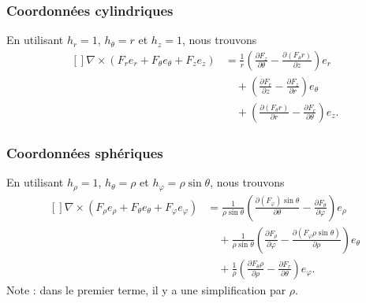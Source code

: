 \subsubsection{Coordonnées cylindriques}

En utilisant $h_r=1$, $h_{\theta}=r$ et $h_z=1$, nous trouvons
\begin{equation}        \label{EqRotationnelCylin}
	\begin{aligned}[]
		\nabla\times(F_re_r+F_{\theta}e_{\theta}+F_ze_z) & =\frac{1}{ r }\left( \frac{ \partial F_z }{ \partial \theta }-\frac{ \partial (F_{\theta}r) }{ \partial z } \right)e_r \\
		                                                 & \quad+\left( \frac{ \partial F_r }{ \partial z }-\frac{ \partial F_z }{ \partial r } \right)e_{\theta}                 \\
		                                                 & \quad+\left( \frac{ \partial (F_{\theta} r) }{ \partial r }-\frac{ \partial F_r }{ \partial \theta } \right)e_z.
	\end{aligned}
\end{equation}

\subsubsection{Coordonnées sphériques}

En utilisant $h_{\rho}=1$, $h_{\theta}=\rho$ et $h_{\varphi}=\rho\sin\theta$, nous trouvons
\begin{equation}
	\begin{aligned}[]
		\nabla\times(F_{\rho}e_{\rho}+F_{\theta}e_{\theta}+F_{\varphi}e_{\varphi}) & =\frac{1}{ \rho\sin\theta }\left( \frac{ \partial (F_{\varphi})\sin\theta }{ \partial \theta }-\frac{ \partial F_{\theta} }{ \partial \varphi } \right)e_{\rho}        \\
		                                                                           & \quad+\frac{1}{ \rho\sin\theta }\left( \frac{ \partial F_{\rho} }{ \partial \varphi }-\frac{ \partial (F_{\varphi}\rho\sin\theta) }{ \partial \rho } \right)e_{\theta} \\
		                                                                           & \quad+\frac{1}{ \rho }\left( \frac{ \partial F_{\theta}\rho }{ \partial \rho }-\frac{ \partial F_r }{ \partial \theta } \right)e_{\varphi}.
	\end{aligned}
\end{equation}
Note : dans le premier terme, il y a une simplification par $\rho$.

